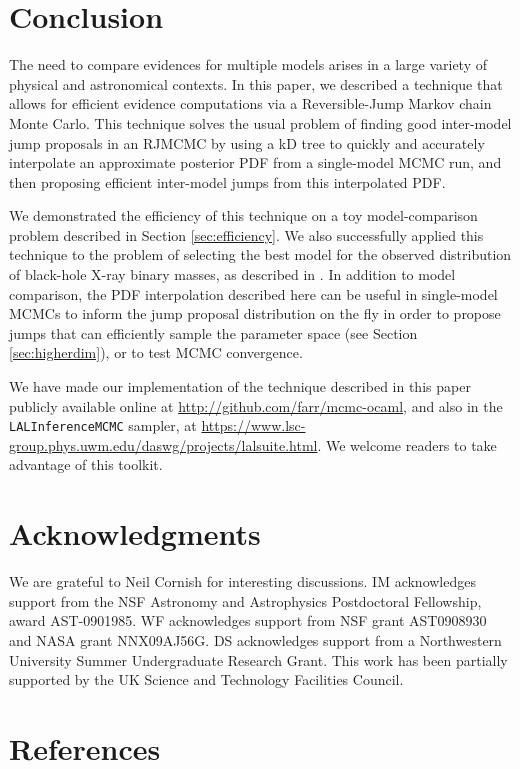 \documentclass{iopart}
\begin{document}
\section{Conclusion}
\label{sec:conclusion}

The need to compare evidences for multiple models arises in a large
variety of physical and astronomical contexts.  In this paper, we
described a technique that allows for efficient evidence
computations via a Reversible-Jump Markov chain Monte Carlo.  This
technique solves the usual problem of finding good inter-model jump
proposals in an RJMCMC by using a kD tree to quickly and accurately
interpolate an approximate posterior PDF from a single-model MCMC run,
and then proposing efficient inter-model
jumps from this interpolated PDF.

We demonstrated the efficiency of this technique on a toy
model-comparison problem described in Section \ref{sec:efficiency}.
We also successfully applied this technique to the problem of
selecting the best model for the observed distribution of black-hole
X-ray binary masses, as described in \cite{Farr2010}.  In addition to
model comparison, the PDF interpolation described here can be useful
in single-model MCMCs to inform the jump proposal distribution on the fly in order to propose jumps that can efficiently sample the parameter space (see Section \ref{sec:higherdim}), or to test MCMC convergence. 

We have made our implementation of the technique described in this
paper publicly available online at
\url{http://github.com/farr/mcmc-ocaml}, and also in the
\texttt{LALInferenceMCMC} sampler, at
\url{https://www.lsc-group.phys.uwm.edu/daswg/projects/lalsuite.html}.
We welcome readers to take advantage of this toolkit.


\section*{Acknowledgments}

We are grateful to Neil Cornish for interesting discussions.  IM
acknowledges support from the NSF Astronomy and Astrophysics
Postdoctoral Fellowship, award AST-0901985.  WF acknowledges support
from NSF grant AST0908930 and NASA grant NNX09AJ56G. DS acknowledges
support from a Northwestern University Summer Undergraduate Research Grant.  This work has been partially supported by the UK Science and Technology Facilities Council.

\section*{References}


%
\end{document}
